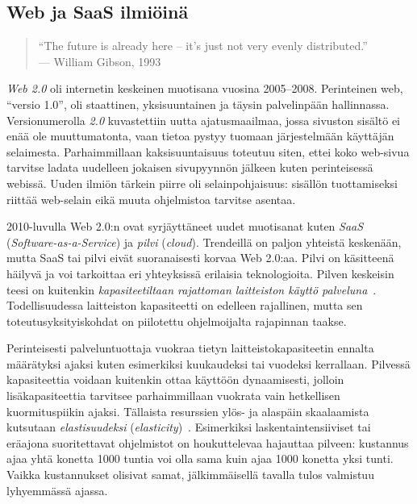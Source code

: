 \documentclass[finnish,gradu]{tktltiki}
\begin{document}
\subsection{Web ja SaaS ilmiöinä} %

\label{sub:web_ja_saas}

  \begin{quote}
    ``The future is already here -- it's just not very evenly distributed.''
    \\ --- William Gibson, 1993
  \end{quote}

  \emph{Web 2.0} oli internetin keskeinen muotisana vuosina 2005--2008. Perinteinen web, ``versio 1.0'', oli staattinen, yksisuuntainen ja täysin palvelinpään hallinnassa. Versionumerolla \emph{2.0} kuvastettiin uutta ajatusmaailmaa, jossa sivuston sisältö ei enää ole muuttumatonta, vaan tietoa pystyy tuomaan järjestelmään käyttäjän selaimesta. Parhaimmillaan kaksisuuntaisuus toteutuu siten, ettei koko web-sivua tarvitse ladata uudelleen jokaisen sivupyynnön jälkeen kuten perinteisessä webissä. Uuden ilmiön tärkein piirre oli selainpohjaisuus: sisällön tuottamiseksi riittää web-selain eikä muuta ohjelmistoa tarvitse asentaa.

  2010-luvulla Web 2.0:n ovat syrjäyttäneet uudet muotisanat kuten \emph{SaaS} (\emph{Software-as-a-Service}) ja \emph{pilvi} (\emph{cloud}). Trendeillä on paljon yhteistä keskenään, mutta SaaS tai pilvi eivät suoranaisesti korvaa Web 2.0:aa. Pilvi on käsitteenä häilyvä ja voi tarkoittaa eri yhteyksissä erilaisia teknologioita. Pilven keskeisin teesi on kuitenkin \emph{kapasiteetiltaan rajattoman laitteiston käyttö palveluna}~\cite{berkeley_cloud_2009}. Todellisuudessa laitteiston kapasiteetti on edelleen rajallinen, mutta sen toteutusyksityiskohdat on piilotettu ohjelmoijalta rajapinnan taakse.

   Perinteisesti palveluntuottaja vuokraa tietyn laitteistokapasiteetin ennalta määrätyksi ajaksi kuten esimerkiksi kuukaudeksi tai vuodeksi kerrallaan. Pilvessä kapasiteettia voidaan kuitenkin ottaa käyttöön dynaamisesti, jolloin lisäkapasiteettia tarvitsee parhaimmillaan vuokrata vain hetkellisen kuormituspiikin ajaksi. Tällaista resurssien ylös- ja alaspäin skaalaamista kutsutaan \emph{elastisuudeksi} (\emph{elasticity})~\cite{berkeley_cloud_2009}. Esimerkiksi laskentaintensiiviset tai eräajona suoritettavat ohjelmistot on houkuttelevaa hajauttaa pilveen: kustannus ajaa yhtä konetta 1000 tuntia voi olla sama kuin ajaa 1000 konetta yksi tunti. Vaikka kustannukset olisivat samat, jälkimmäisellä tavalla tulos valmistuu lyhyemmässä ajassa.
\end{document}
